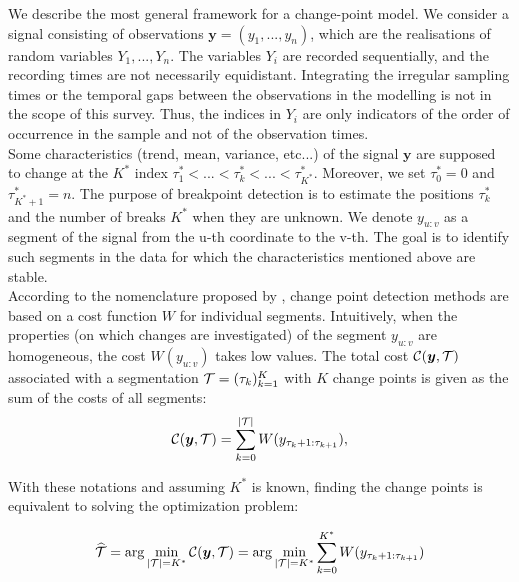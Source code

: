 We describe the most general framework for a change-point model. We consider a signal consisting of observations $\bm y = (y_1,...,y_n)$, which are the realisations of random variables $Y_1,...,Y_n$. The variables $Y_i$ are recorded sequentially, and the recording times are not necessarily equidistant. Integrating the irregular sampling times or the temporal gaps between the observations in the modelling is not in the scope of this survey. Thus, the indices in $Y_i$ are only indicators of the order of occurrence in the sample and not of the observation times. \\
Some characteristics (trend, mean, variance, etc...) of the signal $\bm y$ are supposed to change at the $K^*$ index $\tau^*_1 <... < \tau^*_k <... < \tau^*_{K^*}$. Moreover, we set $\tau^*_0 = 0$ and $\tau^*_{K^*+1} = n$. The purpose of breakpoint detection is to estimate the positions $\tau^*_k$ and the number of breaks $K^*$ when they are unknown. We denote $y_{u:v}$ as a segment of the signal from the u-th coordinate to the v-th. The goal is to identify such segments in the data for which the characteristics mentioned above are stable. \\
According to the nomenclature proposed by \cite{truong2020}, change point detection methods are based on a cost function $W$ for individual segments. Intuitively, when the properties (on which changes are investigated) of the segment $y_{u:v}$ are homogeneous, the cost $W(y_{u:v})$ takes low values. The total cost ${\mathcal C}(\bm y,{\mathcal T})$ associated with a segmentation ${\mathcal T} = (\tau_{k})_{k=1}^K$ with $K$ change points is given as the sum of the costs of all segments:
\begin{equation}\label{chp:3:costfunc}
{\mathcal C}(\bm y,{\mathcal T}) = \sum_{k=0}^{\lvert {\mathcal T} \rvert} W(y_{\tau_k+1:\tau_{k+1}}), 
\end{equation}     

With these notations and assuming $K^*$ is known, finding the change points is equivalent to solving the optimization problem:

\begin{equation}\label{chp:3:optKknown}
 \widehat{{\mathcal T}}  = \arg \min_{\lvert {\mathcal T} \rvert = K^*}  {\mathcal C}(\bm y, {\mathcal T}) = \arg \min_{\lvert {\mathcal T} \rvert = K^*} \sum_{k=0}^{K^*} W(y_{\tau_k+1:\tau_{k+1}})   
\end{equation}


